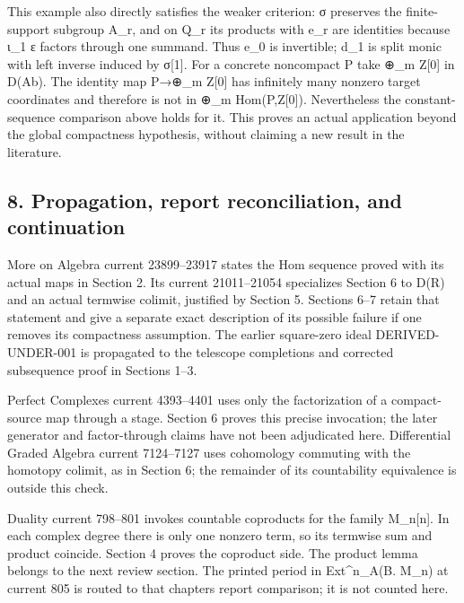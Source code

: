 This example also directly satisfies the weaker criterion:\allowbreak{} σ preserves the finite-support subgroup A\_\allowbreak{}r,\allowbreak{} and on Q\_\allowbreak{}r its products with e\_\allowbreak{}r are identities because ι\_\allowbreak{}1 ε factors through one summand. Thus e\_\allowbreak{}0 is invertible; d\_\allowbreak{}1 is split monic with left inverse induced by σ[1]\allowbreak{}. For a concrete noncompact P take \allowbreak{}⊕\_\allowbreak{}m Z[0]\allowbreak{} in D(Ab)\allowbreak{}. The identity map P\allowbreak{}→\allowbreak{}⊕\_\allowbreak{}m Z[0]\allowbreak{} has infinitely many nonzero target coordinates and therefore is not in \allowbreak{}⊕\_\allowbreak{}m Hom(P,\allowbreak{}Z[0]\allowbreak{})\allowbreak{}. Nevertheless the constant-sequence comparison above holds for it. This proves an actual application beyond the global compactness hypothesis,\allowbreak{} without claiming a new result in the literature.

\subsection{\texorpdfstring{8. Propagation,\allowbreak{} report reconciliation,\allowbreak{} and continuation}{8.  report  and continuation}}\label{proofs-10139-10427-propagation-report-reconciliation-and-continuation}

More on Algebra current 23899–\allowbreak{}23917 states the Hom sequence proved with its actual maps in Section 2. Its current 21011–\allowbreak{}21054 specializes Section 6 to D(R)\allowbreak{} and an actual termwise colimit,\allowbreak{} justified by Section 5. Sections 6–\allowbreak{}7 retain that statement and give a separate exact description of its possible failure if one removes its compactness assumption. The earlier square-zero ideal DERIVED-UNDER-001 is propagated to the telescope completions and corrected subsequence proof in Sections 1–\allowbreak{}3.

Perfect Complexes current 4393–\allowbreak{}4401 uses only the factorization of a compact-source map through a stage. Section 6 proves this precise invocation; the later generator and factor-through claims have not been adjudicated here. Differential Graded Algebra current 7124–\allowbreak{}7127 uses cohomology commuting with the homotopy colimit,\allowbreak{} as in Section 6; the remainder of its countability equivalence is outside this check.

Duality current 798–\allowbreak{}801 invokes countable coproducts for the family M\_\allowbreak{}n[n]\allowbreak{}. In each complex degree there is only one nonzero term,\allowbreak{} so its termwise sum and product coincide. Section 4 proves the coproduct side. The product lemma belongs to the next review section. The printed period in Ext\textasciicircum{}n\_\allowbreak{}A(B. M\_\allowbreak{}n)\allowbreak{} at current 805 is routed to that chapter\textquotesingle s report comparison; it is not counted here.

